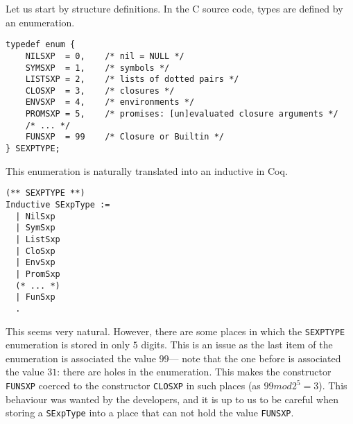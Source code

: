 \documentclass{article}
\newcommand\Coq{Coq}
\newcommand\Cn{C}
\newcommand\mod{\mathit{mod}}
\begin{document}
Let us start by structure definitions.
In the \Cn{} source code, types are defined by an enumeration.
\begin{verbatim}
typedef enum {
    NILSXP  = 0,    /* nil = NULL */
    SYMSXP  = 1,    /* symbols */
    LISTSXP = 2,    /* lists of dotted pairs */
    CLOSXP  = 3,    /* closures */
    ENVSXP  = 4,    /* environments */
    PROMSXP = 5,    /* promises: [un]evaluated closure arguments */
    /* ... */
    FUNSXP  = 99    /* Closure or Builtin */
} SEXPTYPE;
\end{verbatim}
This enumeration is naturally translated into an inductive in \Coq{}.
\begin{verbatim}
(** SEXPTYPE **)
Inductive SExpType :=
  | NilSxp
  | SymSxp
  | ListSxp
  | CloSxp
  | EnvSxp
  | PromSxp
  (* ... *)
  | FunSxp
  .
\end{verbatim}
This seems very natural.
However, there are some places in which the \texttt{SEXPTYPE}
enumeration is stored in only \(5\) digits.
This is an issue as the last item of the enumeration
is associated the value \(99\)—%
note that the one before is associated the value \(31\):
there are holes in the enumeration.
This makes the constructor \texttt{FUNSXP} coerced
to the constructor \texttt{CLOSXP} in such places
(as \(99 \mod 2^5 = 3\)).
This behaviour was wanted by the developers,
and it is up to us to be careful when storing a \texttt{SExpType}
into a place that can not hold the value \texttt{FUNSXP}.
\end{document}
